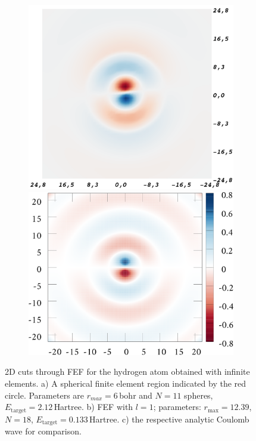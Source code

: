 \begin{figure}
\begin{subfigure}{0.47\textwidth}
   \includegraphics[width=\textwidth]{Figures/RBF/p_wave}
   \includegraphics[width=\textwidth]{Figures/RBF/P-Wave}
   \caption{}
   \label{fig:cutInfb}
\end{subfigure}
\caption{2D cuts through FEF for the hydrogen atom obtained with infinite elements. a) A spherical finite element region indicated by the red circle. Parameters are $r_{max}=6\,$bohr and $N=11$ spheres, $E_\text{target}=2.12\,$Hartree. b) FEF with $l=1$; parameters: $r_\text{max}=12.39$, $N=18$, 
$E_\text{target}=0.133\,$Hartree. c) the respective analytic Coulomb wave for comparison.
	}
\label{fig:cutInf}
\end{figure}

